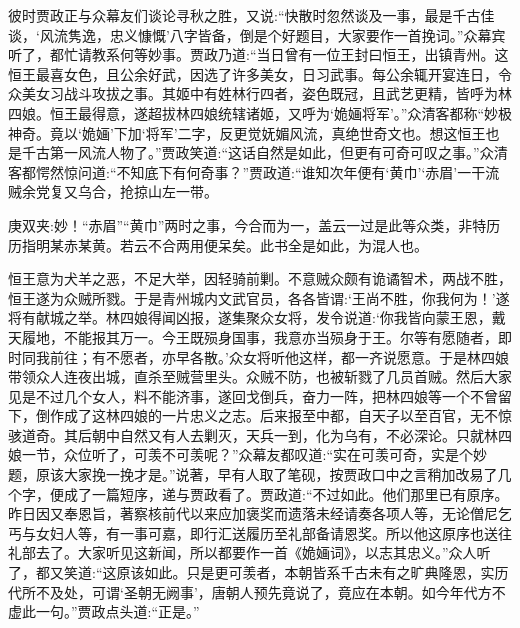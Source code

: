 \begin{parag}
    彼时贾政正与众幕友们谈论寻秋之胜，又说:“快散时忽然谈及一事，最是千古佳谈，‘风流隽逸，忠义慷慨’八字皆备，倒是个好题目，大家要作一首挽词。”众幕宾听了，都忙请教系何等妙事。贾政乃道:“当日曾有一位王封曰恒王，出镇青州。这恒王最喜女色，且公余好武，因选了许多美女，日习武事。每公余辄开宴连日，令众美女习战斗攻拔之事。其姬中有姓林行四者，姿色既冠，且武艺更精，皆呼为林四娘。恒王最得意，遂超拔林四娘统辖诸姬，又呼为‘姽婳将军’。”众清客都称“妙极神奇。竟以‘姽婳’下加‘将军’二字，反更觉妩媚风流，真绝世奇文也。想这恒王也是千古第一风流人物了。”贾政笑道:“这话自然是如此，但更有可奇可叹之事。”众清客都愕然惊问道:“不知底下有何奇事？”贾政道:“谁知次年便有‘黄巾’‘赤眉’一干流贼余党复又乌合，抢掠山左一带。\begin{note}庚双夹:妙！“赤眉”“黄巾”两时之事，今合而为一，盖云一过是此等众类，非特历历指明某赤某黄。若云不合两用便呆矣。此书全是如此，为混人也。\end{note}恒王意为犬羊之恶，不足大举，因轻骑前剿。不意贼众颇有诡谲智术，两战不胜，恒王遂为众贼所戮。于是青州城内文武官员，各各皆谓:‘王尚不胜，你我何为！’遂将有献城之举。林四娘得闻凶报，遂集聚众女将，发令说道:‘你我皆向蒙王恩，戴天履地，不能报其万一。今王既殒身国事，我意亦当殒身于王。尔等有愿随者，即时同我前往；有不愿者，亦早各散。’众女将听他这样，都一齐说愿意。于是林四娘带领众人连夜出城，直杀至贼营里头。众贼不防，也被斩戮了几员首贼。然后大家见是不过几个女人，料不能济事，遂回戈倒兵，奋力一阵，把林四娘等一个不曾留下，倒作成了这林四娘的一片忠义之志。后来报至中都，自天子以至百官，无不惊骇道奇。其后朝中自然又有人去剿灭，天兵一到，化为乌有，不必深论。只就林四娘一节，众位听了，可羡不可羡呢？”众幕友都叹道:“实在可羡可奇，实是个妙题，原该大家挽一挽才是。”说著，早有人取了笔砚，按贾政口中之言稍加改易了几个字，便成了一篇短序，递与贾政看了。贾政道:“不过如此。他们那里已有原序。昨日因又奉恩旨，著察核前代以来应加褒奖而遗落未经请奏各项人等，无论僧尼乞丐与女妇人等，有一事可嘉，即行汇送履历至礼部备请恩奖。所以他这原序也送往礼部去了。大家听见这新闻，所以都要作一首《姽婳词》，以志其忠义。”众人听了，都又笑道:“这原该如此。只是更可羡者，本朝皆系千古未有之旷典隆恩，实历代所不及处，可谓‘圣朝无阙事’，唐朝人预先竟说了，竟应在本朝。如今年代方不虚此一句。”贾政点头道:“正是。”
\end{parag}


